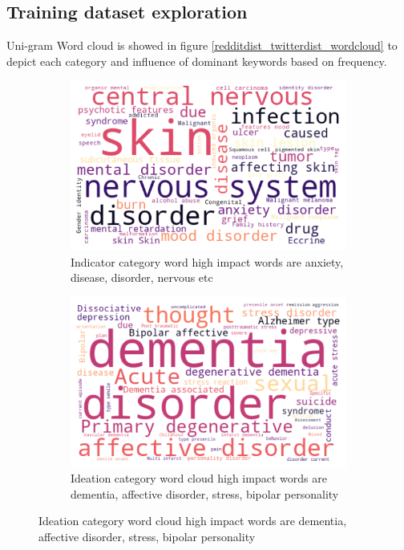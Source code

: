 \documentclass[sn-mathphys,Numbered]{sn-jnl}%
\theoremstyle{thmstyleone}%
\theoremstyle{thmstyletwo}%
\theoremstyle{thmstylethree}%
\begin{document}
\subsection{Training dataset exploration}
Uni-gram Word cloud is showed in figure \ref{redditdist_twitterdist_wordcloud} to depict each category and influence of dominant keywords based on frequency.  
\begin{figure}[h!]
\centering
\begin{subfigure}{0.45\textwidth}
    \includegraphics[width=\textwidth]{indicator_word_cloud.png}
    \caption{Indicator category word high impact words are anxiety, disease, disorder, nervous etc}
    \label{redditdist}
\end{subfigure}
\hfill
\begin{subfigure}{0.45\textwidth}
    \includegraphics[width=\textwidth]{Ideation_word_cloud.png}
    \caption{Ideation category word cloud high impact words are dementia, affective disorder, stress, bipolar personality}
    \label{twitterdist}

\end{subfigure}
\end{figure}
\end{document}
